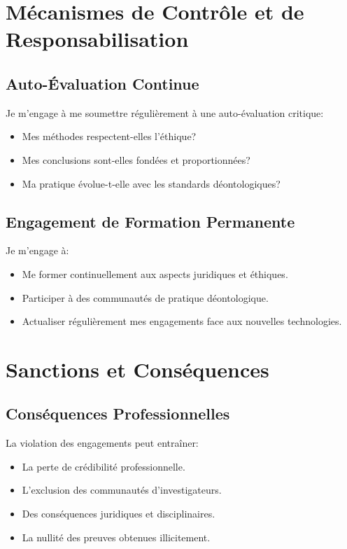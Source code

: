 \documentclass[11pt,a4paper,oneside]{book}
\begin{document}
        \section*{Mécanismes de Contrôle et de Responsabilisation}
            \subsection{Auto-Évaluation Continue}
                Je m'engage à me soumettre régulièrement à une auto-évaluation critique:
                \begin{itemize}
                    \item Mes méthodes respectent-elles l'éthique?
                    \item Mes conclusions sont-elles fondées et proportionnées?
                    \item Ma pratique évolue-t-elle avec les standards déontologiques?
                \end{itemize}

            \subsection*{Engagement de Formation Permanente}
                Je m'engage à:
                \begin{itemize}
                    \item Me former continuellement aux aspects juridiques et éthiques.
                    \item Participer à des communautés de pratique déontologique.
                    \item Actualiser régulièrement mes engagements face aux nouvelles technologies.
                \end{itemize}

        \section*{Sanctions et Conséquences}
            \subsection{Conséquences Professionnelles}
                La violation des engagements peut entraîner:
                \begin{itemize}
                    \item La perte de crédibilité professionnelle.
                    \item L'exclusion des communautés d'investigateurs.
                    \item Des conséquences juridiques et disciplinaires.
                    \item La nullité des preuves obtenues illicitement.
                \end{itemize}
\end{document}
